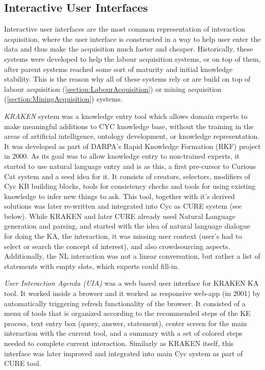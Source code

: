 \subsection{Interactive User Interfaces}
Interactive user interfaces are the most common representation of interaction acquisition, where the user interface is constructed in a way to help user enter the data and thus make the acquisition much faster and cheaper. Historically, these systems were developed to help the labour acquisition systems, or on top of them, after parent systems reached some sort of maturity and initial knowledge stability. This is the reason why all of these systems rely or are build on top of labour acquisition (\autoref{section:LabourAcquisition}) or mining acquisition (\autoref{section:MiningAcquisition}) systems.

\emph{KRAKEN} system was a knowledge entry tool which allows domain experts to make meaningful additions to CYC knowledge base, without the training in the areas of artificial intelligence, ontology development, or knowledge representation\parencite{Panton2002a}. It was developed as part of DARPA's Rapid Knowledge
Formation (RKF) project in 2000. As its goal was to allow knowledge entry to non-trained experts, it started to use natural language entry and is as this, a first pre-cursor to Curious Cat system and a seed idea for it. It consists of creators, selectors, modifiers of Cyc KB building blocks, tools for consistency checks and tools for using existing knowledge to infer new things to ask. This tool, together with it's derived solutions was later re-written and integrated into Cyc as CURE system (see below). While KRAKEN and later CURE already used Natural Language generation and parsing, and started with the idea of natural language dialogue for doing the KA, the interaction, it was missing user context (user's had to select or search the concept of interest), and also crowdsourcing aspects. Additionally, the NL interaction was not a linear conversation, but rather a list of statements with empty slots, which experts could fill-in.

\emph{User Interaction Agenda (UIA)} was a web  based user interface for KRAKEN KA tool\parencite{Panton2002a,Witbrock2003UIA}. It worked inside a browser and it worked as responsive web-app (in 2001) by automatically triggering refresh functionality of the browser. It
consisted of a menu of tools that is organized according to the recommended
steps of the KE process, text entry box (query, answer, statement), center screen for the main interaction with the current tool, and a summary with a set of colored steps needed to complete current interaction. Similarly as KRAKEN itself, this interface was later improved and integrated into main Cyc system as part of CURE tool. 


